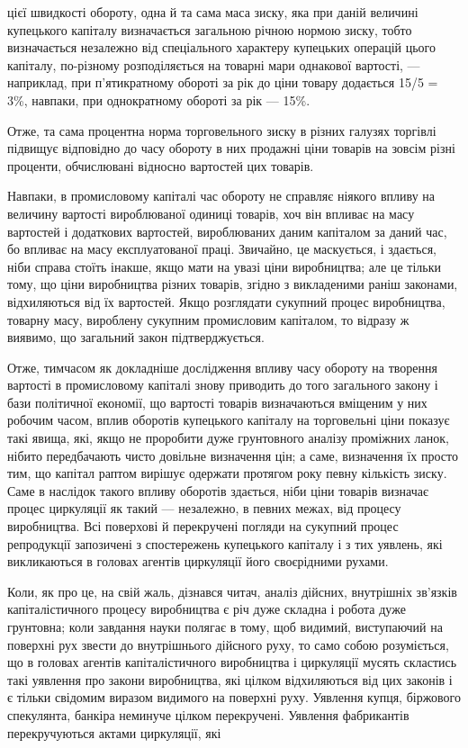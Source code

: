 цієї швидкості обороту, одна й та сама маса зиску, яка при даній
величині купецького капіталу визначається загальною річною
нормою зиску, тобто визначається незалежно від спеціального
характеру купецьких операцій цього капіталу, по-різному розподіляється
на товарні мари однакової вартості, — наприклад, при п’ятикратному
обороті за рік до ціни товару додається 15/5 = 3\%,
навпаки, при однократному обороті за рік — 15\%.

Отже, та сама процентна норма торговельного зиску в різних
галузях торгівлі підвищує відповідно до часу обороту в них
продажні ціни товарів на зовсім різні проценти, обчислювані
відносно вартостей цих товарів.

Навпаки, в промисловому капіталі час обороту не справляє
ніякого впливу на величину вартості вироблюваної одиниці товарів,
хоч він впливає на масу вартостей і додаткових вартостей,
вироблюваних даним капіталом за даний час, бо впливає на
масу експлуатованої праці. Звичайно, це маскується, і здається,
ніби справа стоїть інакше, якщо мати на увазі ціни виробництва;
але це тільки тому, що ціни виробництва різних товарів, згідно
з викладеними раніш законами, відхиляються від їх вартостей.
Якщо розглядати сукупний процес виробництва, товарну масу,
вироблену сукупним промисловим капіталом, то відразу ж виявимо,
що загальний закон підтверджується.

Отже, тимчасом як докладніше дослідження впливу часу
обороту на творення вартості в промисловому капіталі знову
приводить до того загального закону і бази політичної економії,
що вартості товарів визначаються вміщеним у них робочим
часом, вплив оборотів купецького капіталу на торговельні ціни
показує такі явища, які, якщо не проробити дуже грунтовного аналізу
проміжних ланок, нібито передбачають чисто довільне визначення
цін; а саме, визначення їх просто тим, що капітал раптом
вирішує одержати протягом року певну кількість зиску. Саме
в наслідок такого впливу оборотів здається, ніби ціни товарів
визначає процес циркуляції як такий — незалежно, в певних межах,
від процесу виробництва. Всі поверхові й перекручені
погляди на сукупний процес репродукції запозичені з спостережень
купецького капіталу і з тих уявлень, які викликаються
в головах агентів циркуляції його своєрідними рухами.

Коли, як про це, на свій жаль, дізнався читач, аналіз дійсних,
внутрішніх зв’язків капіталістичного процесу виробництва є
річ дуже складна і робота дуже грунтовна; коли завдання
науки полягає в тому, щоб видимий, виступаючий на поверхні
рух звести до внутрішнього дійсного руху, то само собою
розуміється, що в головах агентів капіталістичного виробництва
і циркуляції мусять скластись такі уявлення про закони виробництва,
які цілком відхиляються від цих законів і є тільки свідомим
виразом видимого на поверхні руху. Уявлення купця,
біржового спекулянта, банкіра неминуче цілком перекручені.
Уявлення фабрикантів перекручуються актами циркуляції, які
